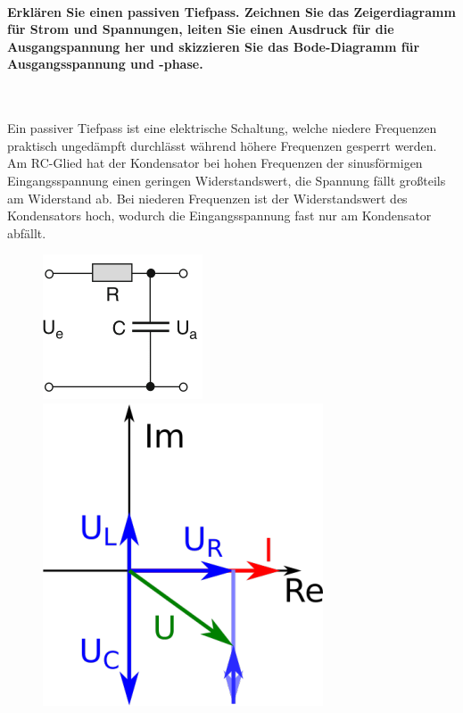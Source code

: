 \documentclass[a4paper, 11pt, ngerman, parskip=half-]{scrartcl}
\begin{document}
\paragraph{Erklären Sie einen passiven Tiefpass. Zeichnen Sie das Zeigerdiagramm für Strom und
    Spannungen, leiten Sie einen Ausdruck für die Ausgangspannung her und skizzieren Sie das
    Bode-Diagramm für Ausgangsspannung und -phase.} ~

Ein passiver Tiefpass ist eine elektrische Schaltung, welche niedere Frequenzen praktisch ungedämpft
durchlässt während höhere Frequenzen gesperrt werden. Am RC-Glied hat der Kondensator bei hohen
Frequenzen der sinusförmigen Eingangsspannung einen geringen Widerstandswert, die Spannung fällt
großteils am Widerstand ab. Bei niederen Frequenzen ist der Widerstandswert des Kondensators hoch,
wodurch die Eingangsspannung fast nur am Kondensator abfällt.

\begin{figure}[H]
    \centering
    \begin{minipage}{0.45\textwidth}
        \flushright
        \includegraphics[width=0.5\linewidth]{image/10/4.3.png}
    \end{minipage}
    \qquad
    \begin{minipage}{0.45\textwidth}
        \flushleft
        \includegraphics[width=0.5\linewidth]{image/10/2.png}
    \end{minipage}
\end{figure}
\end{document}
